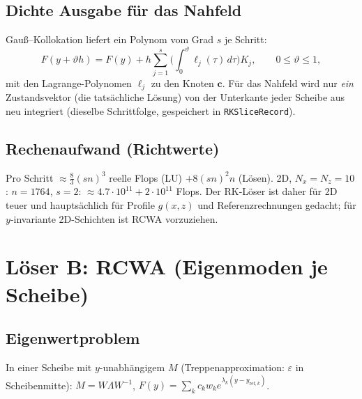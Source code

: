 \subsection{Dichte Ausgabe für das Nahfeld}
Gauß--Kollokation liefert ein Polynom vom Grad $s$ je Schritt:
\begin{equation}
  F(y+\vartheta h)=F(y)+h\sum_{j=1}^{s}\Big(\int_0^{\vartheta}\ell_j(\tau)\,d\tau\Big)K_j,\qquad 0\le\vartheta\le1,
  \label{eq:dense}
\end{equation}
mit den Lagrange-Polynomen $\ell_j$ zu den Knoten $\mathbf c$. Für das Nahfeld wird nur \emph{ein}
Zustandsvektor (die tatsächliche Lösung) von der Unterkante jeder Scheibe aus neu integriert
(dieselbe Schrittfolge, gespeichert in \verb|RKSliceRecord|).

\subsection{Rechenaufwand (Richtwerte)}
Pro Schritt $\approx\frac83(sn)^3$ reelle Flops (LU) $+8(sn)^2n$ (Lösen). 2D, $N_x=N_z=10$:
$n=1764$, $s=2$: $\approx4.7\cdot10^{11}+2\cdot10^{11}$ Flops. Der RK-Löser ist daher für 2D teuer und
hauptsächlich für Profile $g(x,z)$ und Referenzrechnungen gedacht; für $y$-invariante 2D-Schichten
ist RCWA vorzuziehen.

\section{Löser B: RCWA (Eigenmoden je Scheibe)}\label{sec:rcwa}

\subsection{Eigenwertproblem}
In einer Scheibe mit $y$-unabhängigem $M$ (Treppenapproximation: $\varepsilon$ in Scheibenmitte):
$M=W\Lambda W^{-1}$, $F(y)=\sum_kc_kw_ke^{\lambda_k(y-y_{\text{ref},k})}$.
